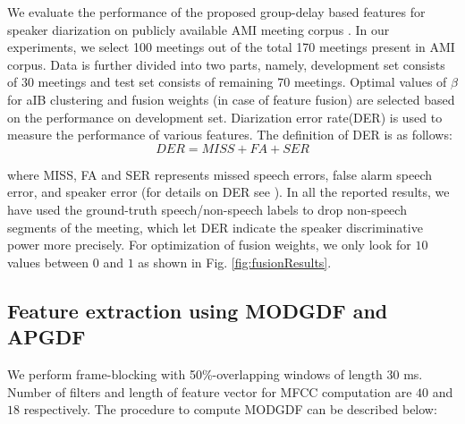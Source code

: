 \documentclass[conference]{IEEEtran}
\begin{document}
We evaluate the performance of the proposed group-delay based features for speaker diarization on publicly available AMI meeting corpus \cite{AMIData}. In our experiments, we select 100 meetings out of the total 170 meetings present in AMI corpus. Data is further divided into two parts, namely, development set consists of $30$ meetings and test set consists of remaining $70$ meetings. Optimal values of $\beta$ for aIB clustering and fusion weights (in case of feature fusion) are selected based on the performance on development set. Diarization error rate(DER) is used to measure the performance of various features. The definition of DER is as follows: 
\begin{equation}
DER = MISS + FA + SER
\end{equation}

where MISS, FA and SER represents  missed speech errors, false alarm speech error, and speaker error (for details on DER see \cite{NIST}). In all the reported results, we have used the ground-truth speech/non-speech labels to drop non-speech segments of the meeting, which let DER indicate the speaker discriminative power more precisely. For optimization of fusion weights, we only look for $10$ values between $0$ and $1$ as shown in Fig. \ref{fig:fusionResults}.

\subsection{Feature extraction using MODGDF and APGDF}

We perform frame-blocking with 50\%-overlapping windows of length 30 ms. Number of filters and length of feature vector for MFCC computation are $40$ and $18$ respectively. The procedure to compute MODGDF can be described below:
\end{document}

